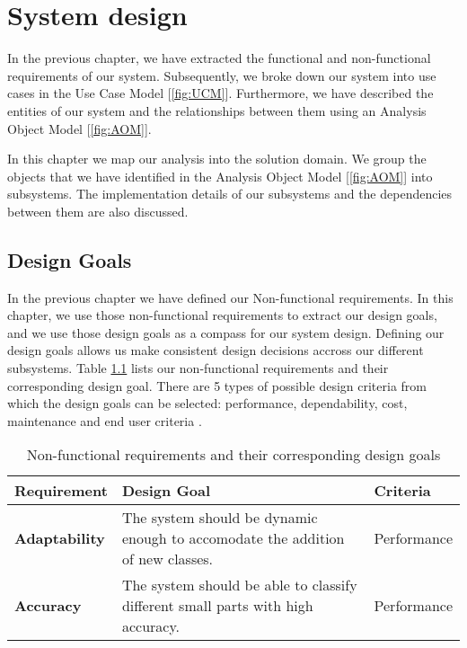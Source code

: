 \chapter{System design}\label{ch:system_design}

In the previous chapter, we have extracted the functional and non-functional requirements of our system. Subsequently, we broke down our system into use cases in the Use Case Model [\ref{fig:UCM}]. Furthermore, we have described the entities of our system and the relationships between them using an Analysis Object Model [\ref{fig:AOM}].

In this chapter we map our analysis into the solution domain. We group the objects that we have identified in the Analysis Object Model [\ref{fig:AOM}] into subsystems. The implementation details of our subsystems and the dependencies between them are also discussed.

\section{Design Goals}

In the previous chapter we have defined our Non-functional requirements. In this chapter, we use those non-functional requirements to extract our design goals, and we use those design goals as a compass for our system design. Defining our design goals allows us make consistent design decisions accross our different subsystems. Table \ref{tab:DG} lists our non-functional requirements and their corresponding design goal. There are 5 types of possible design criteria from which the design goals can be selected: performance, dependability, cost, maintenance and end user criteria \cite{bruegge2004object}.

\begin{table}
  \centering
  \begin{tabular}{ | l | p{5cm} | l | }
    \hline
    \textbf{Requirement} & \textbf{Design Goal} & \textbf{Criteria} \\ \hline
    \textbf{Adaptability} & The system should be dynamic enough to accomodate the addition of new classes. & Performance \\ \hline
    \textbf{Accuracy} & The system should be able to classify different small parts with high accuracy. & Performance \\ \hline
  \end{tabular}
  \caption{Non-functional requirements and their corresponding design goals}
  \label{tab:DG}
\end{table}

